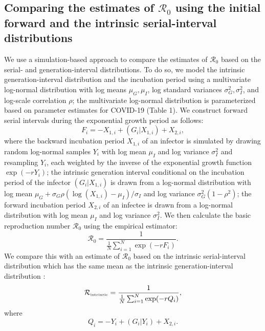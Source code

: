 \documentclass[12pt]{article}
\newcommand{\Rx}[1]{\ensuremath{{\mathcal R}_{#1}}\xspace}
\newcommand{\Ro}{\Rx{0}}
\newcommand{\Rintrinsic}{\ensuremath{{\mathcal R}_{\textrm{\tiny intrinsic}}}\xspace}
\begin{document}
\subsection{Comparing the estimates of \Ro using the initial forward and the intrinsic serial-interval distributions}

We use a simulation-based approach to compare the estimates of \Ro based on the serial- and generation-interval distributions. 
To do so, we model the intrinsic generation-interval distribution and the incubation period using a multivariate log-normal distribution with log means $\mu_G, \mu_I$, log standard variances $\sigma_G^2, \sigma_I^2$, and log-scale correlation $\rho$;
the multivariate log-normal distribution is parameterized based on parameter estimates for COVID-19 (Table 1).
We construct forward serial intervals during the exponential growth period as follows:
\begin{equation}
F_i = -X_{1,i} + (G_i|X_{1,i}) + X_{2,i},
\end{equation}
where the backward incubation period $X_{1,i}$ of an infector is simulated by drawing random log-normal samples $Y_i$ with log mean $\mu_I$ and log variance $\sigma_I^2$ and resampling $Y_i$, each weighted by the inverse of the exponential growth function $\exp(-rY_i)$;
the intrinsic generation interval conditional on the incubation period of the infector $(G_i|X_{1,i})$ is drawn from a log-normal distribution with log mean $\mu_G + \sigma_G \rho (\log(X_{1,i}) - \mu_I)/\sigma_I$ and log variance $\sigma_G^2 (1-\rho^2)$;
the forward incubation period $X_{2,i}$ of an infectee is drawn from a log-normal distribution with log mean $\mu_I$ and log variance $\sigma_I^2$.
We then calculate the basic reproduction number \Ro using the empirical estimator:
\begin{equation}
\Ro = \frac{1}{\frac{1}{N}\sum_{i=1}^N \exp(- r F_i)}.
\end{equation}
We compare this with an estimate of \Ro based on the intrinsic serial-interval distribution which has the same mean as the intrinsic generation-interval distribution \citep{svensson2007note,klinkenberg2011correlation,champredon2018equivalence, britton2019estimation}:
\begin{equation}
  \Rintrinsic = \frac{1}{\frac{1}{N}\sum_{i=1}^N \exp(- r Q_i)},
\end{equation}
where
\begin{equation}
Q_i = -Y_i + (G_i|Y_i) + X_{2,i}.
\end{equation}
\end{document}
